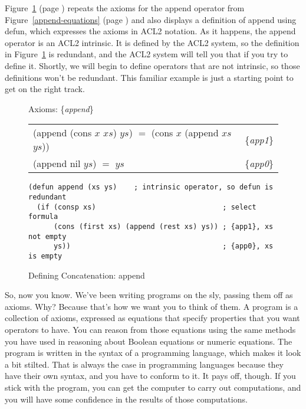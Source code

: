 Figure~\ref{fig:append-defun} (page \pageref{fig:append-defun})
repeats the axioms for the \textsf{append} operator from
Figure~\ref{append-equations} (page \pageref{append-equations})
and also displays a definition of \textsf{append} using \textsf{defun},
which expresses the axioms in ACL2 notation.
As it happens, the \textsf{append} operator is an ACL2 intrinsic.
It is defined by the ACL2 system, so the definition
in Figure~\ref{fig:append-defun} is redundant,
and the ACL2 system will tell you that if you try to define it.
Shortly, we will begin to define operators that are not
intrinsic, so those definitions won't be redundant.
This familiar example is just
a starting point to get on the right track.

\begin{figure}
\begin{center}
Axioms: \{\emph{append}\} \\
\begin{tabular}{ll}
\textsf{(append (cons $x$ $xs$) $ys$)} $=$ \textsf{(cons $x$ (append $xs$ $ys$))} & \{\emph{app1}\} \\
\textsf{(append nil $ys$)} $=$  $ys$                                     & \{\emph{app0}\} \\
\end{tabular}
\begin{Verbatim}
(defun append (xs ys)    ; intrinsic operator, so defun is redundant
  (if (consp xs)                              ; select formula
      (cons (first xs) (append (rest xs) ys)) ; {app1}, xs not empty
      ys))                                    ; {app0}, xs is empty
\end{Verbatim}
\end{center}
\caption{Defining Concatenation: append}
\label{fig:append-defun}
\end{figure}

So, now you know. We've been writing
programs
on the sly, passing them off as axioms.
Why? Because that's how we want you to think of them.
A program is a collection of axioms, expressed as equations
that specify properties that you want operators to have.
You can reason from those equations using the same methods
you have used in reasoning about Boolean equations or numeric equations.
The program is written in the syntax of a programming language,
which makes it look a bit stilted.
That is always the case in programming languages because
they have their own syntax, and you have to conform to it.
It pays off, though.
If you stick with the program, you can get the computer to carry out
computations, and you will have some confidence in the results
of those computations.

